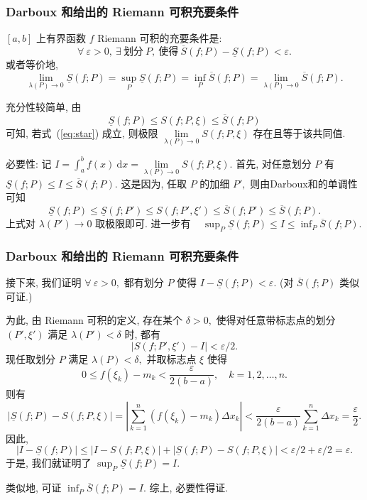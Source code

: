 \begin{frame}
\frametitle{Darboux 和给出的 Riemann 可积充要条件}

\begin{thm}
$[a,b]$ 上有界函数 $f$ Riemann 可积的充要条件是:
\[
\forall~\varepsilon > 0, ~\exists~\text{划分}~P, ~\text{使得}~\overline{S}(f; P) - \underline{S}(f; P) < \varepsilon.
\]
或者等价地,
\begin{equation}
\lim_{\lambda(P) \to 0} \underline{S}(f; P) = \sup_P \underline{S}(f; P) = \inf_P \overline{S}(f; P) = \lim_{\lambda(P) \to 0} \overline{S}(f; P).
\tag{$\star$}
\label{eq:star}
\end{equation}
\end{thm}

\pause
\vspace{0.5em}

{\color{red}} 充分性较简单, 由
\[
\underline{S}(f; P) \leqslant S(f; P,\xi) \leqslant \overline{S}(f; P)
\]
可知, 若式~(\ref{eq:star}) 成立, 则极限 $\lim\limits_{\lambda(P) \to 0} S(f; P,\xi)$ 存在且等于该共同值.

\pause

{\color{red}} 必要性: 记 $I = \int_a^b f(x) ~ \mathrm{d} x = \lim\limits_{\lambda(P) \to 0} S(f; P,\xi).$ 首先, 对任意划分 $P$ 有 $\underline{S}(f; P) \leqslant I \leqslant \overline{S}(f; P).$ 这是因为, 任取 $P$ 的加细 $P',$ 则由Darboux和的单调性可知
\[
\underline{S}(f; P) \leqslant \underline{S}(f; P') \leqslant S(f; P',\xi') \leqslant \overline{S}(f; P') \leqslant \overline{S}(f; P).
\]
上式对 $\lambda(P') \to 0$ 取极限即可. 进一步有 ~ $\sup_P \underline{S}(f; P) \leqslant I \leqslant \inf_P \overline{S}(f; P).$

\end{frame}


\begin{frame}
\frametitle{Darboux 和给出的 Riemann 可积充要条件}

接下来, 我们证明 $\forall ~ \varepsilon > 0,$ 都有划分 $P$ 使得 $I - \underline{S}(f; P) < \varepsilon.$ (对 $\overline{S}(f; P)$ 类似可证.)

为此, 由 Riemann 可积的定义, 存在某个 $\delta > 0,$ 使得对任意带标志点的划分 $(P', \xi')$ 满足 $\lambda(P') < \delta$ 时, 都有
\[
|S(f; P',\xi') - I| < \varepsilon/2.
\]
现任取划分 $P$ 满足 $\lambda(P) < \delta,$ 并取标志点 $\xi$ 使得
\[
0 \leqslant f(\xi_k) - m_k < \frac{\varepsilon}{2(b-a)}, \quad k = 1, 2, \dots, n.
\]
则有
\[
|\underline{S}(f; P) - S(f; P,\xi)| = \left| \sum_{k=1}^n (f(\xi_k) - m_k) \Delta x_k \right| < \frac{\varepsilon}{2(b-a)} \sum_{k=1}^n \Delta x_k = \frac{\varepsilon}{2}.
\]
因此,
\[
|I - \underline{S}(f; P)| \leqslant |I - S(f; P,\xi)| + |\underline{S}(f; P) - S(f; P,\xi)| < \varepsilon/2 + \varepsilon/2 = \varepsilon.
\]
于是, 我们就证明了 $\sup_P \underline{S}(f; P) = I.$

类似地, 可证 $\inf_P \overline{S}(f; P) = I.$ 综上, 必要性得证.
\end{frame}

